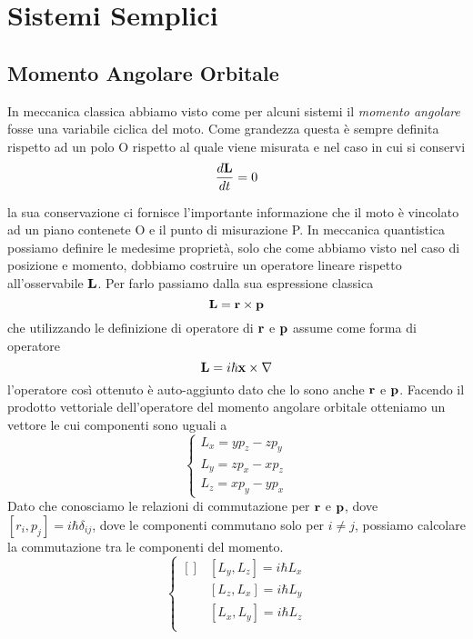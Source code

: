 \setcounter{chapter}{2}
\chapter{Sistemi Semplici}

\section{Momento Angolare Orbitale}

In meccanica classica abbiamo visto come per alcuni sistemi il \textit{momento angolare} fosse una variabile ciclica del moto. Come grandezza questa \`e sempre definita rispetto ad un polo O rispetto al quale viene misurata e nel caso in cui si conservi 
\begin{equation*}
	\frac{d \bold{L}}{d t} = 0
\end{equation*}

la sua conservazione ci fornisce l'importante informazione che il moto \`e vincolato ad un piano contenete O e il punto di misurazione P. In meccanica quantistica possiamo definire le medesime propriet\`a, solo che come abbiamo visto nel caso di posizione e momento, dobbiamo costruire un operatore lineare rispetto all'osservabile $\bold{L}$. Per farlo passiamo dalla sua espressione classica 
\begin{equation*}
	\bold{L} = \bold{r} \times \bold{p}
\end{equation*}
che utilizzando le definizione di operatore di $\bold{r}$ e $\bold{p}$ assume come forma di operatore
\begin{equation}
	\bold{L} = i\hbar \bold{x} \times \nabla 
\end{equation}
l'operatore cos\`i ottenuto \`e auto-aggiunto dato che lo sono anche $\bold{r}$ e $\bold{p}$.
Facendo il prodotto vettoriale dell'operatore del  momento angolare orbitale otteniamo un vettore le cui componenti sono uguali a
\begin{equation*}
	\left \{ \begin{array}{l}
		L_x = yp_z - z p_y \\
		L_y = zp_x - x p_z \\ 
		L_z = xp_y - yp_x
	\end{array} \right.
\end{equation*}
Dato che conosciamo le relazioni di commutazione per $\bold{r}$ e $\bold{p}$, dove $[r_i,p_j] = i \hbar \delta_{ij}$, dove le componenti commutano solo per $i \neq j$, possiamo calcolare la commutazione tra le componenti del momento. 
\begin{equation*}
	\left \{ \begin{aligned}[]
 	 &[L_y,L_z] = i \hbar L_x \\ 
 	 &[L_z,L_x] = i \hbar L_y \\ 
 	 &[L_x,L_y] = i \hbar L_z \\
 \end{aligned}\right.
\end{equation*}

